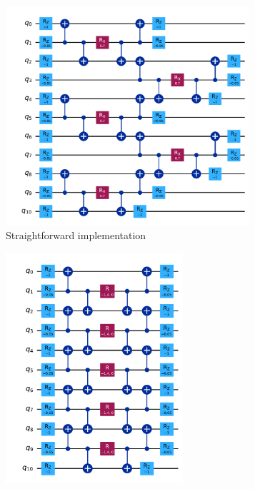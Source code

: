 \documentclass[a4paper]{article}
\begin{document}
\begin{figure}
    \centering
    \begin{subfigure}[bl]{0.3\textwidth}
        \centering
        \includegraphics[width=0.99\textwidth]{second_order_trotter_old.pdf}
        \caption{Straightforward implementation}
    \end{subfigure}
    \begin{subfigure}[bl]{0.3\textwidth}
        \centering
        \includegraphics[width=0.72\textwidth]{second_order_trotter.pdf}

\end{subfigure}
\end{figure}
\end{document}
